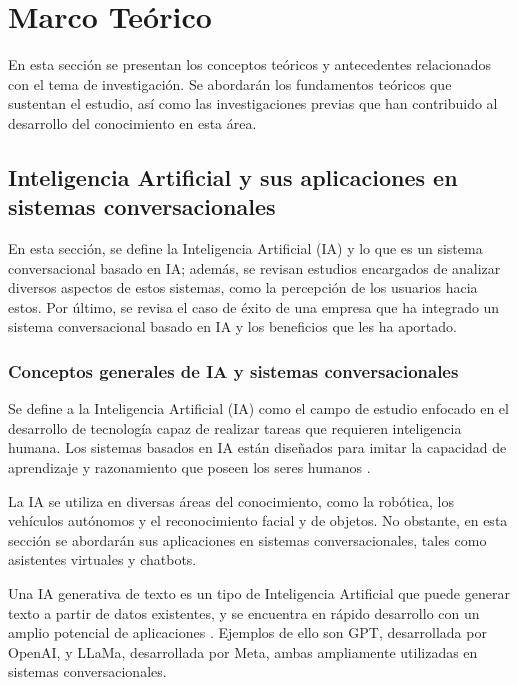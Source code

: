 \section{Marco Teórico}
\label{ch:marco_teorico}

En esta sección se presentan los conceptos teóricos y antecedentes relacionados con el tema de investigación. Se abordarán los fundamentos teóricos que sustentan el estudio, así como las investigaciones previas que han contribuido al desarrollo del conocimiento en esta área.

\subsection{Inteligencia Artificial y sus aplicaciones en sistemas conversacionales}
\label{sec:inteligencia_artificial}

En esta sección, se define la Inteligencia Artificial (IA) y lo que es un sistema conversacional basado en IA; además, se revisan estudios encargados de analizar diversos aspectos de estos sistemas, como la percepción de los usuarios hacia estos. Por último, se revisa el caso de éxito de una empresa que ha integrado un sistema conversacional basado en IA y los beneficios que les ha aportado.

\subsubsection{Conceptos generales de IA y sistemas conversacionales}
\label{subsec:ia_conceptos}

Se define a la Inteligencia Artificial (IA) como el campo de estudio enfocado en el desarrollo de tecnología capaz de realizar tareas que requieren inteligencia humana. Los sistemas basados en IA están diseñados para imitar la capacidad de aprendizaje y razonamiento que poseen los seres humanos \cite{rivera2023inteligencias}.

La IA se utiliza en diversas áreas del conocimiento, como la robótica, los vehículos autónomos y el reconocimiento facial y de objetos. No obstante, en esta sección se abordarán sus aplicaciones en sistemas conversacionales, tales como asistentes virtuales y chatbots.

Una IA generativa de texto es un tipo de Inteligencia Artificial que puede generar texto a partir de datos existentes, y se encuentra en rápido desarrollo con un amplio potencial de aplicaciones \cite{rivera2023inteligencias}. Ejemplos de ello son GPT, desarrollada por OpenAI, y LLaMa, desarrollada por Meta, ambas ampliamente utilizadas en sistemas conversacionales.

